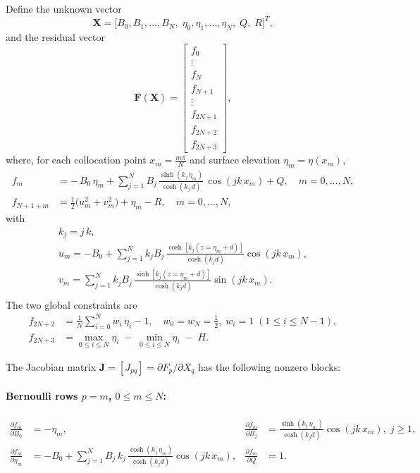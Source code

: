 \documentclass{article}
\begin{document}
Define the unknown vector
\[
\mathbf{X} = \bigl[B_{0}, B_{1},\dots,B_{N},\;\eta_{0},\eta_{1},\dots,\eta_{N},\;Q,\;R\bigr]^{T},
\]
and the residual vector
\[
\mathbf{F}(\mathbf{X}) =
\begin{bmatrix}
f_{0}\\
\vdots\\
f_{N}\\[0.5ex]
f_{N+1}\\
\vdots\\
f_{2N+1}\\[0.5ex]
f_{2N+2}\\
f_{2N+3}
\end{bmatrix},
\]
where, for each collocation point \(x_{m} = \tfrac{m\pi}{N}\) and surface elevation \(\eta_{m} = \eta(x_{m})\),
\begin{align}
f_{m} &= -\,B_{0}\,\eta_{m}
       + \sum_{j=1}^{N} B_{j}\,\frac{\sinh(k_{j}\,\eta_{m})}{\cosh(k_{j}\,d)}\,\cos(jk\,x_{m})
       + Q,
       \quad m=0,\dots,N,
       \\
f_{N+1+m} &= \tfrac12\bigl(u_{m}^{2}+v_{m}^{2}\bigr)
            + \eta_{m} - R,
       \quad m=0,\dots,N,
\end{align}
with
\begin{align}
k_{j} = j\,k, \\[0.5ex]
u_{m} = -B_{0} + \sum_{j=1}^{N} k_{j}B_{j}\,\frac{\cosh[k_{j}(z=\eta_{m}+d)]}{\cosh(k_{j}d)}\cos(jk\,x_{m}),
 \\[0.5ex]
v_{m} = \sum_{j=1}^{N} k_{j}B_{j}\,\frac{\sinh[k_{j}(z=\eta_{m}+d)]}{\cosh(k_{j}d)}\sin(jk\,x_{m}). \\[0.5ex]
\end{align}
The two global constraints are
\begin{align}
f_{2N+2} &= \frac{1}{N}\sum_{i=0}^{N} w_i\,\eta_{i} - 1,
\quad w_{0}=w_{N}=\tfrac12,\;w_{i}=1\;(1\le i\le N-1),
\\
f_{2N+3} &= \max_{0\le i\le N}\!\eta_{i}\;-\;\min_{0\le i\le N}\!\eta_{i}\;-\;H.
\end{align}

The Jacobian matrix \(\mathbf{J} = [J_{pq}]=\partial F_{p}/\partial X_{q}\) has the following nonzero blocks:

\paragraph{Bernoulli rows \(p=m\), \(0\le m\le N\):}
\begin{align}
\frac{\partial f_{m}}{\partial B_{0}}
  &= -\eta_{m},
  &
\frac{\partial f_{m}}{\partial B_{j}}
  &= \frac{\sinh(k_{j}\,\eta_{m})}{\cosh(k_{j}d)}\cos(jk\,x_{m}),\; j\ge1,
  \\
\frac{\partial f_{m}}{\partial \eta_{m}}
  &= -B_{0}
     + \sum_{j=1}^{N}B_{j}\,k_{j}\,\frac{\cosh(k_{j}\,\eta_{m})}{\cosh(k_{j}d)}\cos(jk\,x_{m}),
  &
\frac{\partial f_{m}}{\partial Q}
  &= 1.
\end{align}
\end{document}
